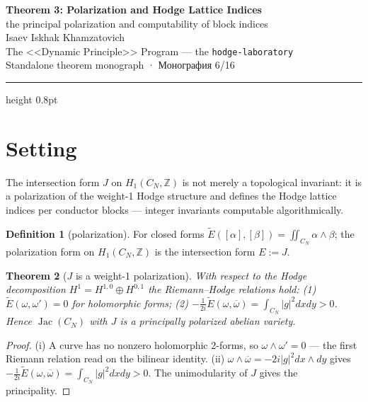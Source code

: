 \documentclass[11pt,a4paper]{article}
\theoremstyle{plain}
\newtheorem{theorem}{Theorem}
\theoremstyle{definition}
\newtheorem{definition}[theorem]{Definition}
\theoremstyle{remark}
\newcommand{\ZZ}{\mathbb{Z}}
\newcommand{\Jac}{\operatorname{Jac}}
\begin{document}
\begin{center}
{\LARGE\bfseries Theorem 3: Polarization and Hodge Lattice Indices}\\[0.4em]
{\large the principal polarization and computability of block indices}\\[0.6em]
{\normalsize Isaev Iskhak Khamzatovich}\\[0.2em]
{\normalsize The <<Dynamic Principle>> Program --- the \texttt{hodge-laboratory}}\\[0.15em]
{\small Standalone theorem monograph · Монография 6/16}
\end{center}
\vspace{0.4em}
{\color{linkblue}\hrule height 0.8pt}
\vspace{0.8em}

\section{Setting}

The intersection form $J$ on $H_1(C_N,\ZZ)$ is not merely a
topological invariant: it is a polarization of the weight-1 Hodge
structure and defines the Hodge lattice indices per conductor
blocks --- integer invariants computable algorithmically.

\begin{definition}[polarization]
For closed forms $\widetilde E([\alpha],[\beta])
=\iint_{C_N}\alpha\wedge\beta$; the polarization form on
$H_1(C_N,\ZZ)$ is the intersection form $E:=J$.
\end{definition}

\begin{theorem}[$J$ is a weight-1 polarization]\label{th:pol}
With respect to the Hodge decomposition
$H^1=H^{1,0}\oplus H^{0,1}$ the Riemann--Hodge relations hold:
(1) $\widetilde E(\omega,\omega')=0$ for holomorphic forms;
(2) $-\frac1{2i}\widetilde E(\omega,\overline{\omega})
=\int_{C_N}|g|^2dxdy>0$. Hence $\Jac(C_N)$ with $J$ is a principally
polarized abelian variety.
\end{theorem}

\begin{proof}
(i) A curve has no nonzero holomorphic 2-forms, so
$\omega\wedge\omega'=0$ --- the first Riemann relation read on the
bilinear identity. (ii)
$\omega\wedge\overline{\omega}=-2i|g|^2dx\wedge dy$ gives
$-\frac1{2i}\widetilde E(\omega,\overline{\omega})
=\int_{C_N}|g|^2dxdy>0$. The unimodularity of $J$ gives the
principality.
\end{proof}
\end{document}
